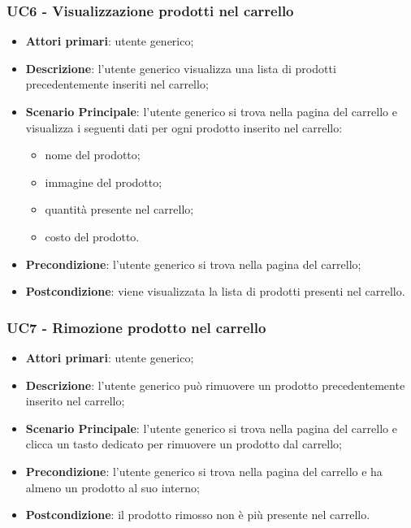 \subsubsection{UC6 - Visualizzazione prodotti nel carrello}
\begin{itemize}
\item \textbf{Attori primari}: utente generico;
\item \textbf{Descrizione}: l'utente generico visualizza una lista di prodotti precedentemente inseriti nel carrello;
\item \textbf{Scenario Principale}: l'utente generico si trova nella pagina del carrello e visualizza i seguenti dati per ogni prodotto inserito nel carrello:
\begin{itemize}
\item nome del prodotto;
\item immagine del prodotto;
\item quantità presente nel carrello;
\item costo del prodotto.
\end{itemize}
\item \textbf{Precondizione}: l'utente generico si trova nella pagina del carrello;
\item \textbf{Postcondizione}: viene visualizzata la lista di prodotti presenti nel carrello.
\end{itemize}

\subsubsection{UC7 - Rimozione prodotto nel carrello}
\begin{itemize}
\item \textbf{Attori primari}: utente generico;
\item \textbf{Descrizione}: l'utente generico può rimuovere un prodotto precedentemente inserito nel carrello;
\item \textbf{Scenario Principale}: l'utente generico si trova nella pagina del carrello e clicca un tasto dedicato per rimuovere un prodotto dal carrello;
\item \textbf{Precondizione}: l'utente generico si trova nella pagina del carrello e ha almeno un prodotto al suo interno;
\item \textbf{Postcondizione}: il prodotto rimosso non è più presente nel carrello.
\end{itemize}

